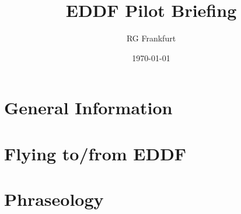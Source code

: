 \documentclass[10pt,a4paper]{article}
\begin{document}
\setlength{\parindent}{0pt}
\begin{titlepage}
\title{EDDF Pilot Briefing}
\author{RG Frankfurt}
\date{\today}
\maketitle
\end{titlepage}

\section{General Information}


\section{Flying to/from EDDF}


\section{Phraseology}

\end{document}
